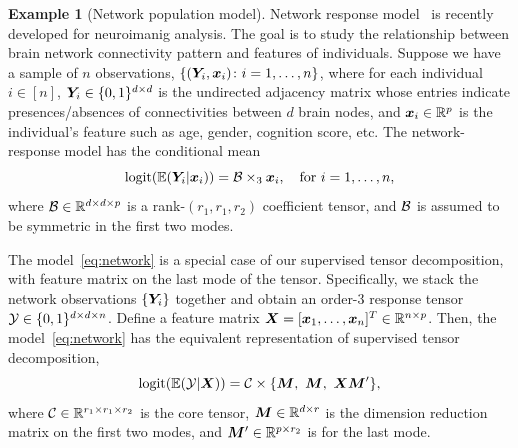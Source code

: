 \documentclass[12pt]{article}
\theoremstyle{definition}
\theoremstyle{definition}
\newtheorem{example}{Example}
\begin{document}
\begin{example}[Network population model]\label{example:brain}
Network response model~\citep{rabusseau2016low, zhang2018network} is recently developed for neuroimanig analysis. The goal is to study the relationship between brain network connectivity pattern and features of individuals. Suppose we have a sample of $n$ observations, $\{(\bm Y_i, \bm x_i)\colon i=1,\ldots,n\}$, where for each individual $i\in[n]$, $\bm Y_i\in\{0,1\}^{d\times d}$ is the undirected adjacency matrix whose entries indicate presences/absences of connectivities between $d$ brain nodes, and $\bm x_i\in\mathbb{R}^p$ is the individual's feature such as age, gender, cognition score, etc. The network-response model  has the conditional mean
\begin{equation}\label{eq:network}
\textup{logit}(\mathbb{E}(\bm Y_i|\bm x_i))=\mathcal{B}\times_3\bm x_i, \quad \text{for }i=1,\ldots,n,
\end{equation}
where $\mathcal{B}\in \mathbb{R}^{d\times d\times p}$ is a rank-$(r_1,r_1,r_2)$ coefficient tensor, and $\mathcal{B}$ is assumed to be symmetric in the first two modes.  

The model~\eqref{eq:network} is a special case of our supervised tensor decomposition, with feature matrix on the last mode of the tensor. Specifically, we stack the network observations $\{\bm Y_i\}$ together and obtain an order-3 response tensor $\mathcal{Y}\in\{0,1\}^{d\times d\times n}$. Define a feature matrix $\bm X=[\bm x_1,\ldots,\bm x_n]^T\in\mathbb{R}^{n\times p}$. Then, the model~\eqref{eq:network} has the equivalent representation of supervised tensor decomposition,
\[
\textup{logit}(\mathbb{E}(\tY|\mX))=\tC\times\{\mM,\ \mM,\ \mX\mM'\},
\]
where $\mathcal{C}\in\mathbb{R}^{r_1\times r_1\times r_2}$ is the core tensor, $\bm M\in\mathbb{R}^{d\times r}$ is the dimension reduction matrix on the first two modes, and $\bm M'\in\mathbb{R}^{p\times r_2}$ is for the last mode.  \end{example}
 
\end{document}
